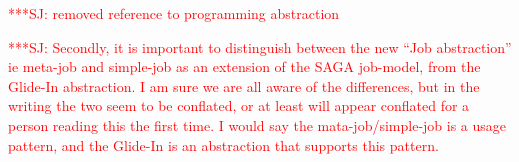 \documentclass{rspublic}
\newcommand{\alnote}[1]{ {\textcolor{blue} { ***AL: #1 }}}
\newcommand{\jhanote}[1]{ {\textcolor{red} { ***SJ: #1 }}}
\newcommand{\alnote}[1]{}
\newcommand{\jhanote}[1]{}
\newcommand{\glidein}[1]{Glide-In }
\newcommand{\remanager}[1]{RE-Manager }
\begin{document}


                                         





\jhanote{removed reference to programming abstraction}


\jhanote{Secondly, it is important to distinguish between the new
  ``Job abstraction'' ie meta-job and simple-job as an extension of
  the SAGA job-model, from the \glidein\ abstraction. I am sure we are
  all aware of the differences, but in the writing the two seem to be
  conflated, or at least will appear conflated for a person reading
  this the first time. I would say the mata-job/simple-job is a usage
  pattern, and the \glidein\ is an abstraction that supports this
  pattern.}
\end{document}
